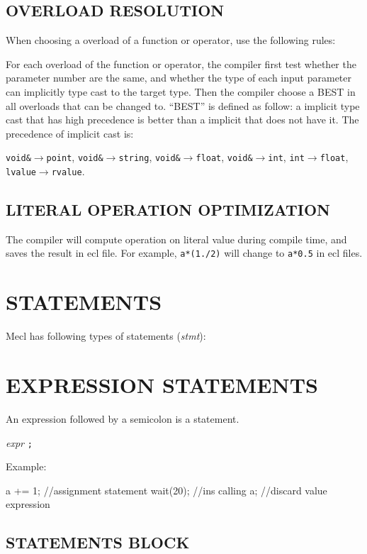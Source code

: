 \documentclass{article}
\begin{document}
\subsection{OVERLOAD RESOLUTION}
\label{chongzai}

When choosing a overload of a function or operator, use the following rules:

For each overload of the function or operator, the compiler first test whether the parameter number are the same, and whether the type of each input parameter can implicitly type cast to the target type. Then the compiler choose a BEST in all overloads that can be changed to. ``BEST'' is defined as follow: a implicit type cast that has high precedence is better than a implicit that does not have it. The precedence of implicit cast is:

\verb|void&|$\to$\verb|point|, \verb|void&|$\to$\verb|string|, \verb|void&|$\to$\verb|float|, \verb|void&|$\to$\verb|int|, \verb|int|$\to$\verb|float|, \verb|lvalue|$\to$\verb|rvalue|.

\subsection{LITERAL OPERATION OPTIMIZATION}

The compiler will compute operation on literal value during compile time, and saves the result in ecl file. For example, \verb|a*(1./2)| will change to \verb|a*0.5| in ecl files.

\section{STATEMENTS}
\label{yuju}

Mecl has following types of statements (\textit{stmt}):

\section{EXPRESSION STATEMENTS}

An expression followed by a semicolon is a statement.

\textit{expr} \verb|;|

Example:

\begin{MUAvbt}
a += 1;			//assignment statement
wait(20);		//ins calling
a;				//discard value expression
\end{MUAvbt}

\subsection{STATEMENTS BLOCK}
\end{document}
